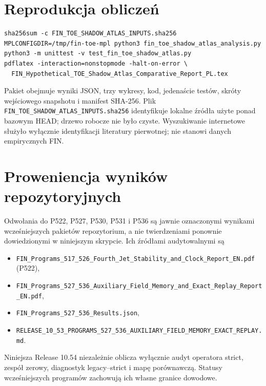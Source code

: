 \documentclass[11pt,a4paper]{article}
\begin{document}
\appendix
\section{Reprodukcja obliczeń}

\begin{verbatim}
sha256sum -c FIN_TOE_SHADOW_ATLAS_INPUTS.sha256
MPLCONFIGDIR=/tmp/fin-toe-mpl python3 fin_toe_shadow_atlas_analysis.py
python3 -m unittest -v test_fin_toe_shadow_atlas.py
pdflatex -interaction=nonstopmode -halt-on-error \
  FIN_Hypothetical_TOE_Shadow_Atlas_Comparative_Report_PL.tex
\end{verbatim}

Pakiet obejmuje wyniki JSON, trzy wykresy, kod, jedenaście testów, skróty wejściowego snapshotu i manifest SHA-256. Plik \texttt{FIN\_TOE\_SHADOW\_ATLAS\_INPUTS.sha256} identyfikuje lokalne źródła użyte ponad bazowym HEAD; drzewo robocze nie było czyste. Wyszukiwanie internetowe służyło wyłącznie identyfikacji literatury pierwotnej; nie stanowi danych empirycznych FIN.

\section{Proweniencja wyników repozytoryjnych}

Odwołania do P522, P527, P530, P531 i P536 są jawnie oznaczonymi wynikami wcześniejszych pakietów repozytorium, a nie twierdzeniami ponownie dowiedzionymi w niniejszym skrypcie. Ich źródłami audytowalnymi są
\begin{itemize}
\item \texttt{FIN\_Programs\_517\_526\_Fourth\_Jet\_Stability\_and\_Clock\_Report\_EN.pdf} (P522),
\item \texttt{FIN\_Programs\_527\_536\_Auxiliary\_Field\_Memory\_and\_Exact\_Replay\_Report\_EN.pdf},
\item \texttt{FIN\_Programs\_527\_536\_Results.json},
\item \texttt{RELEASE\_10\_53\_PROGRAMS\_527\_536\_AUXILIARY\_FIELD\_MEMORY\_EXACT\_REPLAY.md}.
\end{itemize}
Niniejsza Release 10.54 niezależnie oblicza wyłącznie audyt operatora strict, zespół zerowy, diagnostyk legacy--strict i mapę porównawczą. Statusy wcześniejszych programów zachowują ich własne granice dowodowe.
\end{document}

